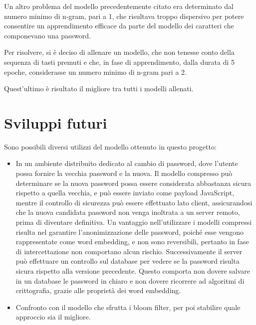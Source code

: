 Un altro problema del modello precedentemente citato era determinato dal numero minimo di n-gram, pari a 1, che risultava troppo dispersivo per potere consentire un apprendimento efficace da parte del modello dei caratteri che componevano una password.

Per risolvere, si è deciso di allenare un modello, che non tenesse conto della sequenza di tasti premuti e che, in fase di apprendimento, dalla durata di 5 epoche, considerasse un numero minimo di n-gram pari a 2.

Quest'ultimo è risultato il migliore tra tutti i modelli allenati.

\section{Sviluppi futuri}
\label{sec:sviluppi futuri}
Sono possibili diversi utilizzi del modello ottenuto in questo progetto:
\begin{itemize}
    \item In un ambiente distribuito dedicato al cambio di password, dove l'utente possa fornire la vecchia password e la nuova. Il modello compresso può determinare se la nuova password possa essere considerata abbastanza sicura rispetto a quella vecchia, e può essere inviato come payload JavaScript, mentre il controllo di sicurezza può essere effettuato lato client, assicurandosi che la nuova candidata password non venga inoltrata a un server remoto, prima di diventare definitiva.
    Un vantaggio nell'utilizzare i modelli compressi risulta nel garantire l'anonimizzazione delle password, poiché esse vengono rappresentate come word embedding, e non sono reversibili, pertanto in fase di intercettazione non comportano alcun rischio. Successivamente il server può effettuare un controllo sul database per vedere se la password risulta sicura rispetto alla versione precedente. Questo comporta non dovere salvare in un database le password in chiaro e non dovere ricorrere ad algoritmi di crittografia, grazie alle proprietà dei word embedding.
    \item Confronto con il modello che sfrutta i bloom filter, per poi stabilire quale approccio sia il migliore.
\end{itemize}
